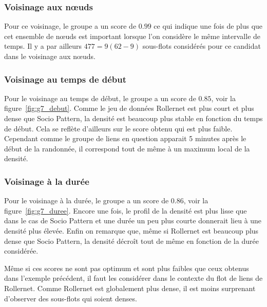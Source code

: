 \subsubsection*{Voisinage aux n\oe uds}
Pour ce voisinage, le groupe a un score de $0.99$ ce qui indique une fois de plus que cet ensemble de n\oe uds est important lorsque l'on considère le même intervalle de temps.
Il y a par ailleurs $477=9(62-9)$ sous-flots considérés pour ce candidat dans le voisinage aux n\oe uds.

\subsubsection*{Voisinage au temps de début}
Pour le voisinage au temps de début, le groupe a un score de $0.85$, voir la figure~\ref{fig:g7_debut}.
Comme le jeu de données Rollernet est plus court et plus dense que Socio Pattern, la densité est beaucoup plus stable en fonction du temps de début.
Cela se reflète d'ailleurs sur le score obtenu qui est plus faible.
Cependant comme le groupe de liens en question apparait 5 minutes après le début de la randonnée, il correspond tout de même à un maximum local de la densité.


\subsubsection*{Voisinage à la durée}
Pour le voisinage à la durée, le groupe a un score de $0.86$, voir la figure~\ref{fig:g7_duree}.
Encore une fois, le profil de la densité est plus lisse que dans le cas de Socio Pattern et une durée un peu plus courte donnerait lieu à une densité plus élevée. 
Enfin on remarque que, même si Rollernet est beaucoup plus dense que Socio Pattern, la densité décroît tout de même en fonction de la durée considérée.

\bigskip

Même si ces scores ne sont pas optimum et sont plus faibles que ceux obtenus dans l'exemple précédent, il faut les considérer dans le contexte du flot de liens de Rollernet.
Comme Rollernet est globalement plus dense, il est moins surprenant d'observer des sous-flots qui soient denses.
 

